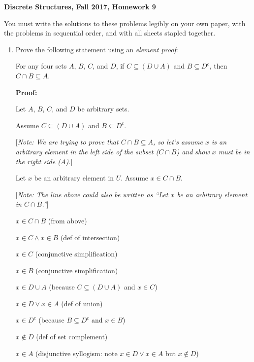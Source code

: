 \documentclass[11pt, letterpaper]{report}
\newcommand{\proofnote}[1]{[\textit{Note: #1}]}
\begin{document}
\textbf{Discrete Structures, Fall 2017, Homework 9}

\bigskip

You must write the solutions to these problems legibly on your own paper, with
the problems in sequential order, and with all sheets stapled together.

\begin{enumerate}

	\item Prove the following statement using an \textit{element proof}:
	
	For any four sets $A$, $B$, $C$, and $D$, if $C \subseteq (D \cup A)$ and $B \subseteq D^c$, then
	$C \cap B \subseteq A$.
	
	
	        
        \textbf{Proof:}
        
        Let $A$, $B$, $C$, and $D$ be arbitrary sets.
        
        Assume $C \subseteq (D \cup A)$ and $B \subseteq D^c$.
        
        \proofnote{We are trying to prove that $C \cap B \subseteq A$, so let's assume $x$ is an arbitrary element in the left side of the subset
        ($C \cap B$) and show $x$ must be in the right side ($A$).}
        
        Let $x$ be an arbitrary element in $U$.  Assume $x \in C \cap B$.  
        
        \proofnote{The line above could also be written as ``Let $x$ be an arbitrary element in $C \cap B$.''}
        
        $x \in C \cap B$ \qquad (from above)
        
        $x \in C \land x \in B$ \qquad (def of intersection)
        
        $x \in C$ \qquad (conjunctive simplification)
        
        $x \in B$ \qquad (conjunctive simplification)
        
        $x \in D \cup A$ \qquad (because $C \subseteq (D \cup A)$ and $x \in C$)
        
        $x \in D \lor x \in A$ \qquad (def of union)
        
        $x \in D^c$ \qquad (because $B \subseteq D^c$ and $x \in B$)
        
        $x \not\in D$ \qquad (def of set complement)
        
        $x \in A$ \qquad (disjunctive syllogism: note $x \in D \lor x \in A$ but $x \not\in D$)
        

\end{enumerate}
\end{document}
